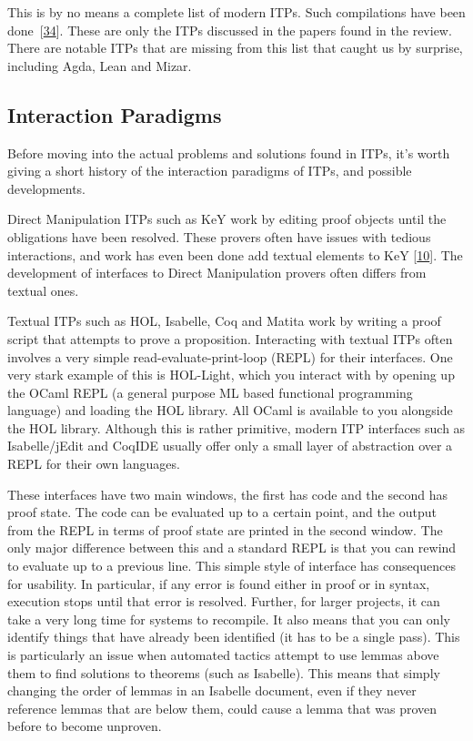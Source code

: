 \documentclass[
]{article}
\begin{document}
This is by no means a complete list of modern ITPs. Such compilations
have been done~{[}\protect\hyperlink{ref-nawaz_survey_2019}{34}{]}.
These are only the ITPs discussed in the papers found in the review.
There are notable ITPs that are missing from this list that caught us by
surprise, including Agda, Lean and Mizar.

\hypertarget{interaction-paradigms}{%
\subsection{Interaction Paradigms}\label{interaction-paradigms}}

Before moving into the actual problems and solutions found in ITPs, it's
worth giving a short history of the interaction paradigms of ITPs, and
possible developments.

Direct Manipulation ITPs such as KeY work by editing proof objects until
the obligations have been resolved. These provers often have issues with
tedious interactions, and work has even been done add textual elements
to KeY {[}\protect\hyperlink{ref-beckert_interaction_2017}{10}{]}. The
development of interfaces to Direct Manipulation provers often differs
from textual ones.

Textual ITPs such as HOL, Isabelle, Coq and Matita work by writing a
proof script that attempts to prove a proposition. Interacting with
textual ITPs often involves a very simple read-evaluate-print-loop
(REPL) for their interfaces. One very stark example of this is
HOL-Light, which you interact with by opening up the OCaml REPL (a
general purpose ML based functional programming language) and loading
the HOL library. All OCaml is available to you alongside the HOL
library. Although this is rather primitive, modern ITP interfaces such
as Isabelle/jEdit and CoqIDE usually offer only a small layer of
abstraction over a REPL for their own languages.

These interfaces have two main windows, the first has code and the
second has proof state. The code can be evaluated up to a certain point,
and the output from the REPL in terms of proof state are printed in the
second window. The only major difference between this and a standard
REPL is that you can rewind to evaluate up to a previous line. This
simple style of interface has consequences for usability. In particular,
if any error is found either in proof or in syntax, execution stops
until that error is resolved. Further, for larger projects, it can take
a very long time for systems to recompile. It also means that you can
only identify things that have already been identified (it has to be a
single pass). This is particularly an issue when automated tactics
attempt to use lemmas above them to find solutions to theorems (such as
Isabelle). This means that simply changing the order of lemmas in an
Isabelle document, even if they never reference lemmas that are below
them, could cause a lemma that was proven before to become unproven.
\end{document}
